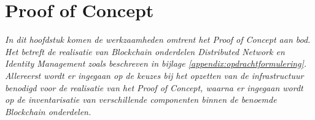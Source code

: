 \chapter{Proof of Concept}

\textit{In dit hoofdstuk komen de werkzaamheden omtrent het Proof of Concept aan bod. Het betreft de realisatie van Blockchain onderdelen Distributed Network en Identity Management zoals beschreven in bijlage \ref{appendix:opdrachtformulering}. Allereerst wordt er ingegaan op de keuzes bij het opzetten van de infrastructuur benodigd voor de realisatie van het Proof of Concept, waarna er ingegaan wordt op de inventarisatie van verschillende componenten binnen de benoemde Blockchain onderdelen.}



\newpage


\newpage


\newpage

